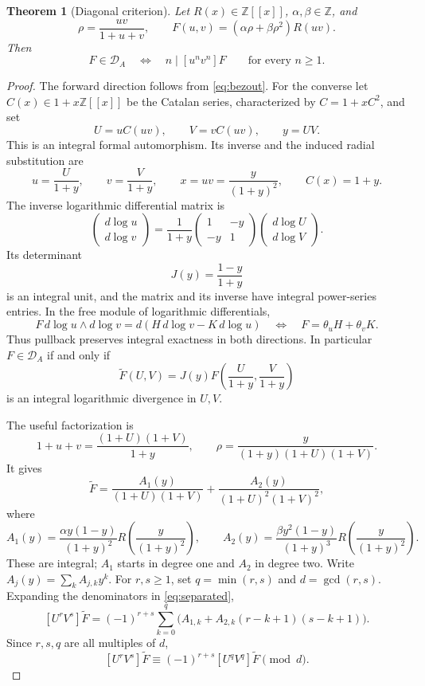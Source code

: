 \documentclass[11pt,a4paper]{article}
\newtheorem{theorem}{Theorem}[section]
\theoremstyle{remark}\newtheorem{remark}[theorem]{Remark}
\newcommand{\Z}{\mathbb Z}\newcommand{\Q}{\mathbb Q}
\begin{document}
\begin{theorem}[Diagonal criterion]\label{thm:catalan}
Let \(R(x)\in\Z[[x]]\), \(\alpha,\beta\in\Z\), and
\[
 \rho=\frac{uv}{1+u+v},\qquad
 F(u,v)=(\alpha\rho+\beta\rho^2)R(uv).
\]
Then
\[
 F\in\mathcal D_A
 \quad\Longleftrightarrow\quad
 n\mid[u^nv^n]F\qquad\text{for every }n\ge1.
\]
\end{theorem}
\begin{proof}
The forward direction follows from \eqref{eq:bezout}.
For the converse let \(C(x)\in1+x\Z[[x]]\) be the Catalan series,
characterized by \(C=1+xC^2\), and set
\[
 U=uC(uv),\qquad V=vC(uv),\qquad y=UV.
\]
This is an integral formal automorphism. Its inverse and the induced
radial substitution are
\begin{equation}\label{eq:catalaninverse}
 u=\frac{U}{1+y},\qquad v=\frac{V}{1+y},\qquad
 x=uv=\frac{y}{(1+y)^2},\qquad C(x)=1+y.
\end{equation}
The inverse logarithmic differential matrix is
\[
 \begin{pmatrix}d\log u\\d\log v\end{pmatrix}
 =\frac1{1+y}
  \begin{pmatrix}1&-y\\-y&1\end{pmatrix}
  \begin{pmatrix}d\log U\\d\log V\end{pmatrix}.
\]
Its determinant
\[
                         J(y)=\frac{1-y}{1+y}
\]
is an integral unit, and the matrix and its inverse have integral
power-series entries. In the free module of logarithmic differentials,
\[
 F\,d\log u\wedge d\log v
       =d(H\,d\log v-K\,d\log u)
 \quad\Longleftrightarrow\quad F=\theta_uH+\theta_vK.
\]
Thus pullback preserves integral exactness in both directions. In
particular \(F\in\mathcal D_A\) if and only if
\[
 \widetilde F(U,V)
       =J(y)F\left(\frac{U}{1+y},\frac{V}{1+y}\right)
\]
is an integral logarithmic divergence in \(U,V\).

The useful factorization is
\[
 1+u+v=\frac{(1+U)(1+V)}{1+y},\qquad
 \rho=\frac{y}{(1+y)(1+U)(1+V)}.
\]
It gives
\begin{equation}\label{eq:separated}
 \widetilde F
   =\frac{A_1(y)}{(1+U)(1+V)}
    +\frac{A_2(y)}{(1+U)^2(1+V)^2},
\end{equation}
where
\[
 A_1(y)=\frac{\alpha y(1-y)}{(1+y)^2}R\left(\frac{y}{(1+y)^2}\right),
 \qquad
 A_2(y)=\frac{\beta y^2(1-y)}{(1+y)^3}R\left(\frac{y}{(1+y)^2}\right).
\]
These are integral; \(A_1\) starts in degree one and \(A_2\) in degree
two. Write \(A_j(y)=\sum_k A_{j,k}y^k\). For \(r,s\ge1\), set
\(q=\min(r,s)\) and \(d=\gcd(r,s)\). Expanding the denominators in
\eqref{eq:separated},
\[
 [U^rV^s]\widetilde F
   =(-1)^{r+s}\sum_{k=0}^{q}
       \bigl(A_{1,k}+A_{2,k}(r-k+1)(s-k+1)\bigr).
\]
Since \(r,s,q\) are all multiples of \(d\),
\begin{equation}\label{eq:gcdreduction}
 [U^rV^s]\widetilde F
       \equiv(-1)^{r+s}[U^qV^q]\widetilde F\pmod d.
\end{equation}


\end{proof}
\end{document}
